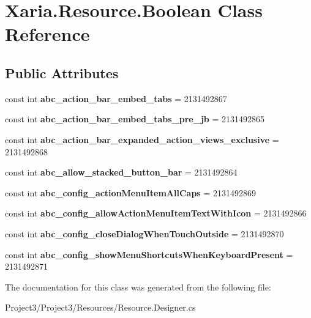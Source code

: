 \hypertarget{classXaria_1_1Resource_1_1Boolean}{}\section{Xaria.\+Resource.\+Boolean Class Reference}
\label{classXaria_1_1Resource_1_1Boolean}
\subsection*{Public Attributes}
\begin{DoxyCompactItemize}
\item 
\mbox{\label{classXaria_1_1Resource_1_1Boolean_a3b0f3e8a231993b65ae0d1b38ea953a0}} 
const int {\bfseries abc\+\_\+action\+\_\+bar\+\_\+embed\+\_\+tabs} = 2131492867
\item 
\mbox{\label{classXaria_1_1Resource_1_1Boolean_a631867416a5d7da158b07cac22bbe93e}} 
const int {\bfseries abc\+\_\+action\+\_\+bar\+\_\+embed\+\_\+tabs\+\_\+pre\+\_\+jb} = 2131492865
\item 
\mbox{\label{classXaria_1_1Resource_1_1Boolean_a113e8816be13ae2c5b19dcc37f68c9f7}} 
const int {\bfseries abc\+\_\+action\+\_\+bar\+\_\+expanded\+\_\+action\+\_\+views\+\_\+exclusive} = 2131492868
\item 
\mbox{\label{classXaria_1_1Resource_1_1Boolean_adee4fd6e338e66fbfffae370908104db}} 
const int {\bfseries abc\+\_\+allow\+\_\+stacked\+\_\+button\+\_\+bar} = 2131492864
\item 
\mbox{\label{classXaria_1_1Resource_1_1Boolean_a588b7a2ea839a28da36ce773e0be4e46}} 
const int {\bfseries abc\+\_\+config\+\_\+action\+Menu\+Item\+All\+Caps} = 2131492869
\item 
\mbox{\label{classXaria_1_1Resource_1_1Boolean_abb784726617848fe7cd7a7ef64b9dbac}} 
const int {\bfseries abc\+\_\+config\+\_\+allow\+Action\+Menu\+Item\+Text\+With\+Icon} = 2131492866
\item 
\mbox{\label{classXaria_1_1Resource_1_1Boolean_ac83241b3a190a5d379d3d75ccae8486e}} 
const int {\bfseries abc\+\_\+config\+\_\+close\+Dialog\+When\+Touch\+Outside} = 2131492870
\item 
\mbox{\label{classXaria_1_1Resource_1_1Boolean_acf74d46288e8e5a64488f52f03b76620}} 
const int {\bfseries abc\+\_\+config\+\_\+show\+Menu\+Shortcuts\+When\+Keyboard\+Present} = 2131492871
\end{DoxyCompactItemize}


The documentation for this class was generated from the following file\+:\begin{DoxyCompactItemize}
\item 
Project3/\+Project3/\+Resources/Resource.\+Designer.\+cs\end{DoxyCompactItemize}
